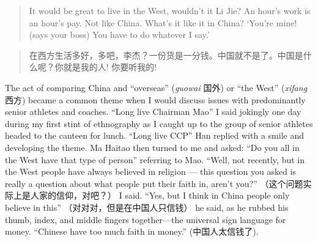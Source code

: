 \begin{CJK}{UTF8}{gbsn}
  \begin{quotation}
    It would be great to live in the West, wouldn’t it Li Jie?  An hour’s work is an hour’s pay.  Not like China.  What’s it like it in China?  `You’re mine! (says your boss) You have to do whatever I say.'
  \end{quotation}


  \begin{quotation}
    在西方生活多好，多吧，李杰？一份货是一分钱。中国就不是了。中国是什么呢？你就是我的人! 你要听我的!
  \end{quotation}



  The act of comparing China and ``overseas'' (\textit{guowai} 国外) or ``the West'' (\textit{xifang} 西方) became a common theme when I would discuss issues with predominantly senior athletes and coaches.
  ``Long live Chairman Mao'' I said jokingly one day during my first stint of ethnography as I caught up to the group of senior athletes headed to the canteen for lunch.  ``Long live CCP'' Han replied with a smile and developing the theme.  Ma Haitao then turned to me and asked: ``Do you all in the West have that type of person'' referring to Mao.  ``Well, not recently, but in the West people have always believed in religion --- this question you asked is really a question about what people put their faith in, aren't you?'' （这个问题实际上是人家的信仰，对吧？） I said.  ``Yes, but I think in China people only believe in this'' （对对对，但是在中国人只信钱） he said, as he rubbed his thumb, index, and middle fingers together---the universal sign language for money. ``Chinese have too much faith in money.'' (中国人太信钱了).


\end{CJK}
